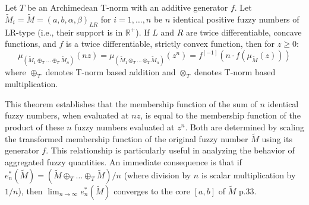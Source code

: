 \begin{theorem}
\label{thm:functional_relationship_add_mult}
Let $T$ be an Archimedean T-norm with an additive generator $f$. Let $\tilde{M}_i = \tilde{M} = (a,b,\alpha,\beta)_{LR}$ for $i=1,\dots,n$ be $n$ identical positive fuzzy numbers of LR-type (i.e., their support is in $\mathbb{R}^+$). If $L$ and $R$ are twice differentiable, concave functions, and $f$ is a twice differentiable, strictly convex function, then for $z \ge 0$:
\begin{equation}
\mu_{(\tilde{M}_1 \oplus_T \dots \oplus_T \tilde{M}_n)}(nz) = \mu_{(\tilde{M}_1 \otimes_T \dots \otimes_T \tilde{M}_n)}(z^n) = f^{[-1]}(n \cdot f(\mu_{\tilde{M}}(z)))
\end{equation}
where $\oplus_T$ denotes T-norm based addition and $\otimes_T$ denotes T-norm based multiplication.
\end{theorem}

\begin{remark}
This theorem establishes that the membership function of the sum of $n$ identical fuzzy numbers, when evaluated at $nz$, is equal to the membership function of the product of these $n$ fuzzy numbers evaluated at $z^n$. Both are determined by scaling the transformed membership function of the original fuzzy number $\tilde{M}$ using its generator $f$. This relationship is particularly useful in analyzing the behavior of aggregated fuzzy quantities. An immediate consequence is that if $e^*_n(\tilde{M}) = (\tilde{M} \oplus_T \dots \oplus_T \tilde{M})/n$ (where division by $n$ is scalar multiplication by $1/n$), then $\lim_{n\to\infty} e^*_n(\tilde{M})$ converges to the core $[a,b]$ of $\tilde{M}$ \cite{FULLER2}{p.33}.
\end{remark}







